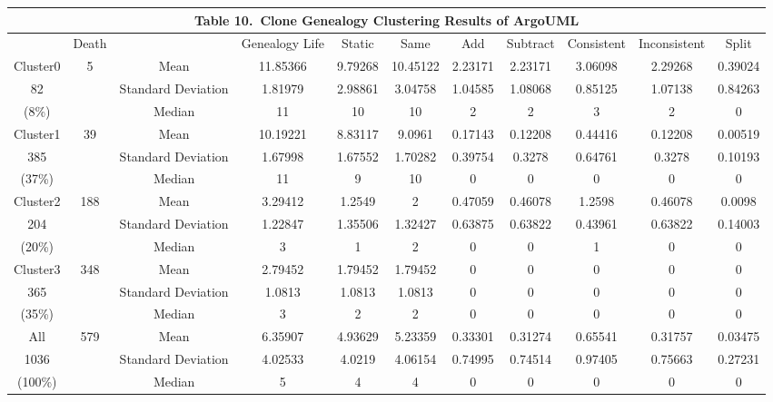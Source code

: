 {
\begin{table}[!htb]
\tabcolsep=2.5pt 
\scriptsize
\begin{center}
\begin{tabular}{|c|c|c|c|c|c|c|c|c|c|c|}
\multicolumn{11}{c}{\bf Table 10.\  Clone Genealogy Clustering Results of ArgoUML }\\ \hline
&Death&&Genealogy Life&	Static&	Same&	Add	&Subtract&	Consistent&	Inconsistent&	Split\\ \hline
Cluster0&\multirow{3}{*}{5}&Mean	&11.85366	&9.79268	&10.45122	&2.23171&	2.23171&	3.06098&	2.29268&	0.39024\\ \cline{3-11}
82&&Standard Deviation	&1.81979	&2.98861&	3.04758&	1.04585&	1.08068	&0.85125&1.07138&	0.84263\\ \cline{3-11}
(8\%)&&Median	&11&	10&	10&	2&	2&	3&	2	&0\\ \hline
Cluster1&\multirow{3}{*}{39}&Mean	&10.19221	&8.83117	&9.0961	&0.17143	&0.12208	&0.44416	&0.12208	&0.00519\\ \cline{3-11}
385&&Standard Deviation&	1.67998	&1.67552	&1.70282	&0.39754&	0.3278	&0.64761&	0.3278	&0.10193\\ \cline{3-11}
(37\%)&&Median	&11	&9	&10	&0&	0&	0&	0	&0\\ \hline
Cluster2&\multirow{3}{*}{188}&Mean	&3.29412	&1.2549	&2	&0.47059	&0.46078	&1.2598	&0.46078	&0.0098\\ \cline{3-11}
204&&Standard Deviation	&1.22847	&1.35506	&1.32427	&0.63875	&0.63822	&0.43961	&0.63822	&0.14003\\ \cline{3-11}
(20\%)&&Median	&3&	1&	2&	0&	0&	1&	0&	0\\ \hline
Cluster3&\multirow{3}{*}{348}&Mean	&2.79452	&1.79452	&1.79452	&0	&0	&0	&0	&0\\ \cline{3-11}
365&&Standard Deviation	&1.0813	&1.0813	&1.0813	&0	&0	&0	&0	&0\\ \cline{3-11}
(35\%)&&Median	&3	&2	&2	&0	&0	&0&	0&	0\\ \hline
All&\multirow{3}{*}{579}&Mean	&6.35907	&4.93629	&5.23359	&0.33301	&0.31274	&0.65541	&0.31757	&0.03475\\ \cline{3-11}
1036&&Standard Deviation	&4.02533	&4.0219	&4.06154	&0.74995	&0.74514	&0.97405	&0.75663	&0.27231\\ \cline{3-11}
(100\%)&&Median&	5&	4&	4&	0&	0&	0&	0&	0\\ \hline
\end{tabular}
\end{center}
\end{table}
}
